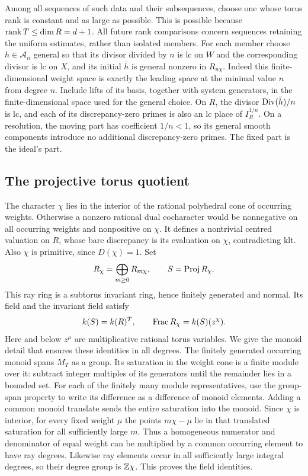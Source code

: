 Among all sequences of such data and their subsequences, choose one
whose torus rank is constant and as large as possible. This is possible
because \(\operatorname{rank} T\leq\dim R=d+1\). All future rank comparisons concern
sequences retaining the uniform estimates, rather than isolated members.
For each member choose \(h\in\mathcal A_n\) general so that its divisor
divided by \(n\) is lc on \(W\) and the corresponding divisor is lc on
\(X\), and its initial \(\bar h\) is general nonzero in \(R_{n\chi}\).
Indeed this finite-dimensional weight space is exactly the leading
space at the minimal value \(n\) from degree \(n\). Include lifts of
its basis, together with system generators, in the finite-dimensional
space used for the general choice. On \(R\), the divisor
\(\operatorname{Div}(\bar h)/n\) is lc, and each of its discrepancy-zero primes is
also an lc place of \(I_R^{1/n}\). On a resolution, the moving part has
coefficient \(1/n<1\), so its general smooth components introduce no
additional discrepancy-zero primes. The fixed part is the ideal's part.

\subsection{The projective torus quotient}
\label{a:quotient}

The character \(\chi\) lies in the interior of the rational polyhedral
cone of occurring weights. Otherwise a nonzero rational dual
cocharacter would be nonnegative on all occurring weights and nonpositive
on \(\chi\). It defines a nontrivial centred valuation on \(R\), whose
bare discrepancy is its evaluation on \(\chi\), contradicting klt.
Also \(\chi\) is primitive, since \(D(\chi)=1\). Set
\[
 R_\chi=\bigoplus_{m\geq0}R_{m\chi},\qquad
 S=\operatorname{Proj} R_\chi.
\]
This ray ring is a subtorus invariant ring, hence finitely generated and
normal. Its field and the invariant field satisfy
\[
           k(S)=k(R)^T,\qquad \operatorname{Frac} R_\chi=k(S)(z^\chi).
\]
Here and below \(z^\mu\) are multiplicative rational torus variables.
We give the monoid detail that ensures these identities in all degrees.
The finitely generated occurring monoid spans \(M_T\) as a group.
Its saturation in the weight cone is a finite module over it: subtract
integer multiples of its generators until the remainder lies in a
bounded set. For each of the finitely many module representatives, use
the group-span property to write its difference as a difference of
monoid elements. Adding a common monoid translate sends the entire
saturation into the monoid. Since \(\chi\) is interior, for every
fixed weight \(\mu\) the points \(m\chi-\mu\) lie in that translated
saturation for all sufficiently large \(m\). Thus a homogeneous
numerator and denominator of equal weight can be multiplied by a common
occurring element to have ray degrees. Likewise ray elements occur in
all sufficiently large integral degrees, so their degree group is
\(\mathbb Z\chi\). This proves the field identities.

